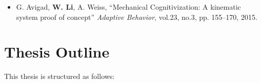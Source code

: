 \begin{itemize}
%
\item G. Avigad, \textbf{W. Li}, A. Weiss, ``Mechanical Cognitivization: A kinematic system proof of concept'' \textit{Adaptive Behavior}, vol.23, no.3, pp. 155--170, 2015.
%
\end{itemize}

\section{Thesis Outline}

This thesis is structured as follows:

